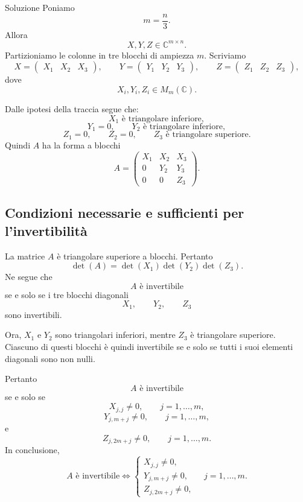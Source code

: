 \documentclass[a4paper]{article}
\begin{document}
\begin{snippetsolution}{Soluzione}
    Poniamo
    \[
        m=\frac{n}{3}.
    \]
    Allora
    \[
        X,Y,Z\in \mathbb{C}^{m\times n}.
    \]
    Partizioniamo le colonne in tre blocchi di ampiezza \(m\). Scriviamo
    \[
        X=
        \begin{pmatrix}
            X_1 & X_2 & X_3
        \end{pmatrix},
        \qquad
        Y=
        \begin{pmatrix}
            Y_1 & Y_2 & Y_3
        \end{pmatrix},
        \qquad
        Z=
        \begin{pmatrix}
            Z_1 & Z_2 & Z_3
        \end{pmatrix},
    \]
    dove
    \[
        X_i,Y_i,Z_i\in M_m(\mathbb{C}).
    \]

    Dalle ipotesi della traccia segue che:
    \[
        X_1 \text{ è triangolare inferiore},
    \]
    \[
        Y_1=0,
        \qquad
        Y_2 \text{ è triangolare inferiore},
    \]
    \[
        Z_1=0,
        \qquad
        Z_2=0,
        \qquad
        Z_3 \text{ è triangolare superiore}.
    \]
    Quindi \(A\) ha la forma a blocchi
    \[
        A=
        \begin{pmatrix}
            X_1 & X_2 & X_3\\
            0 & Y_2 & Y_3\\
            0 & 0 & Z_3
        \end{pmatrix}.
    \]

    \subsection*{Condizioni necessarie e sufficienti per l'invertibilità}

    La matrice \(A\) è triangolare superiore a blocchi. Pertanto
    \[
        \det(A)=\det(X_1)\det(Y_2)\det(Z_3).
    \]
    Ne segue che
    \[
        A \text{ è invertibile}
    \]
    se e solo se i tre blocchi diagonali
    \[
        X_1,
        \qquad
        Y_2,
        \qquad
        Z_3
    \]
    sono invertibili.

    Ora, \(X_1\) e \(Y_2\) sono triangolari inferiori, mentre \(Z_3\) è triangolare superiore. Ciascuno di questi blocchi è quindi invertibile se e solo se tutti i suoi elementi diagonali sono non nulli.

    Pertanto
    \[
        A \text{ è invertibile}
    \]
    se e solo se
    \[
        X_{j,j}\neq 0,
        \qquad j=1,\dots,m,
    \]
    \[
        Y_{j,m+j}\neq 0,
        \qquad j=1,\dots,m,
    \]
    e
    \[
        Z_{j,2m+j}\neq 0,
        \qquad j=1,\dots,m.
    \]
    In conclusione,
    \[
        \boxed{
            A \text{ è invertibile}
            \Longleftrightarrow
            \begin{cases}
                X_{j,j}\neq 0,\\
                Y_{j,m+j}\neq 0,\\
                Z_{j,2m+j}\neq 0,
            \end{cases}
            \quad
            j=1,\dots,m.
        }
    \]


\end{snippetsolution}
\end{document}
